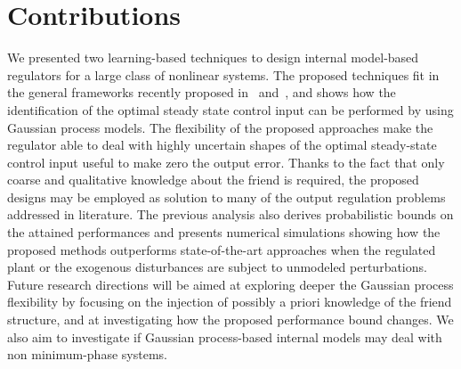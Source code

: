 \section{Contributions}
We presented two learning-based techniques to design internal model-based regulators for a large class of nonlinear systems.
The proposed techniques fit in the general frameworks recently proposed in~\cite{bin2019class} and~\cite{bin2020approximate}, and
shows how the identification of the optimal steady state control input can be performed by using Gaussian process
models. The flexibility of the proposed approaches make the regulator able to deal with highly uncertain shapes of the optimal steady-state control input
useful to make zero the output error. Thanks to the fact that only coarse and qualitative knowledge about the friend is required, the proposed designs
may be employed as solution to many of the output regulation problems addressed in literature. 
The previous analysis also derives probabilistic bounds on the attained performances and presents numerical simulations showing
how the proposed methods outperforms state-of-the-art approaches when the regulated plant or the exogenous disturbances are subject to unmodeled perturbations.
Future research directions will be aimed at exploring deeper the Gaussian process flexibility by focusing on
the injection of possibly a priori knowledge of the friend structure, and at investigating how the proposed performance
bound changes. We also aim to investigate if Gaussian process-based internal models may deal with non minimum-phase systems.

